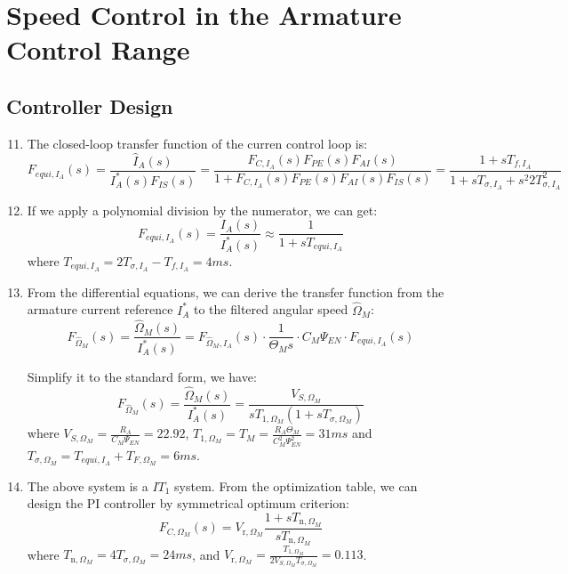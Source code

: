 \documentclass[12pt,a4paper, openany]{book}
\begin{document}
\section{Speed Control in the Armature Control Range}
\subsection{Controller Design}
\begin{enumerate}
\setcounter{enumi}{10} %
\item {\bf *} 
The closed-loop transfer function of the curren control loop is:
\begin{equation}
    F_{equi,I_A}(s) = \frac{\hat{I}_A(s)}{I_A^*(s)F_{IS}(s)} = \frac{F_{C,I_A}(s)F_{PE}(s) F_{AI}(s) }{1 + F_{C,I_A}(s)F_{PE}(s) F_{AI}(s) F_{IS}(s)}=\frac{1+sT_{f,I_{A}}}{1+sT_{\sigma,I_{A}}+s^{2}2T_{\sigma,I_{A}}^{2}}
\end{equation}
\item {\bf *} If we  apply a polynomial division by the numerator, we can get:
\begin{equation}
    F_{equi,I_A}(s)=\frac{I_A(s)}{I_A^*(s)}\approx\frac{1}{1+sT_{equi,I_A}}
\end{equation}
where $T_{equi,I_A} = 2T_{\sigma,I_A} - T_{f,I_A} = 4ms$.
\item {\bf *}   
From the differential equations, we can derive the transfer function from the armature current reference $I^*_A$ to the filtered angular speed $\hat{\Omega}_M$:
\begin{equation}
    F_{\hat{\Omega}_M}(s) = \frac{\hat{\Omega}_M(s)}{I_A^*(s)} = F_{\hat{\Omega}_M,I_A}(s) \cdot \frac{1}{\Theta_M s} \cdot C_M \Psi_{EN} \cdot F_{equi,I_A}(s)
\end{equation}

Simplify it to the standard form, we have:
\begin{equation}
    F_{\hat{\Omega}_M}(s)=\frac{\hat{\Omega}_M(s)}{I_A^*(s)}=\frac{V_{S,\Omega_M}}{sT_{1,\Omega_M}(1+sT_{\sigma,\Omega_M})}
\end{equation}
where $V_{S,\Omega_M} = \frac{R_A}{C_M \Psi_{EN}}=22.92$, $T_{1,\Omega_M} = T_M=\frac{R_A\Theta_M}{C_M^2\Psi_{EN}^2}=31ms$ and $T_{\sigma,\Omega_M} = T_{equi,I_A}+T_{F,\Omega_M}=6ms$.
\item {\bf *}
The above system is a $IT_1$ system. From the optimization table, we can design the PI controller by symmetrical optimum criterion:
\begin{equation}
    F_{C,\Omega_M}(s)=V_{\mathrm{r},\Omega_M}\frac{1+sT_{\mathrm{n},\Omega_M}}{sT_{\mathrm{n},\Omega_M}}
\end{equation}
where $T_{\mathrm{n},\Omega_M} = 4T_{\sigma,\Omega_M}=24ms$, and $V_{\mathrm{r},\Omega_M} = \frac{T_{1,\Omega_M}}{2V_{S,\Omega_M}T_{\sigma,\Omega_M}}=0.113$.
\end{enumerate}
\end{document}
